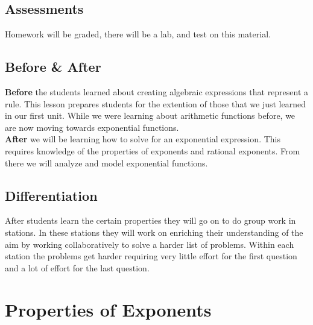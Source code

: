 \documentclass[12pt]{article}
\begin{document}
\subsection*{Assessments} Homework will be graded, there will be a lab, and test on this material. 
	


\subsection*{Before \& After}

	\textbf{Before} the students learned about creating algebraic expressions that represent a rule. This lesson prepares students for the extention of those that we just learned in our first unit. While we were learning about arithmetic functions before, we are now moving towards exponential functions.\\
	


	\textbf{After} we will be learning how to solve for an exponential expression. This requires knowledge of the properties of exponents and rational exponents. From there we will analyze and model exponential functions.
	

	
\subsection*{Differentiation} After students learn the certain properties they will go on to do group work in stations. In these stations they will work on enriching their understanding of the aim by working collaboratively to solve a harder list of problems. Within each station the problems get harder requiring very little effort for the first question and a lot of effort for the last question.\\

\let\stdsection\section
\renewcommand\section{\newpage\stdsection}

\section*{Properties of Exponents}
\end{document}
